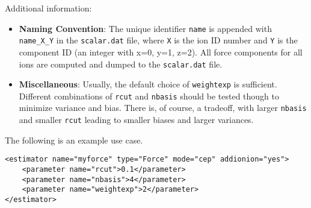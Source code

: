 Additional information:
\begin{itemize}
  \item{\textbf{Naming Convention}:  The unique identifier \texttt{name} is appended with \texttt{name\_X\_Y} in the \texttt{scalar.dat} file, where \texttt{X} is the ion ID number and \texttt{Y} is the component ID (an integer with x=0, y=1, z=2).  All force components for all ions are computed and dumped to the \texttt{scalar.dat} file.}
  \item{\textbf{Miscellaneous}: Usually, the default choice of \texttt{weightexp} is sufficient.  Different combinations of \texttt{rcut} and  \texttt{nbasis} should be tested though to minimize variance and bias.  There is, of course, a tradeoff, with larger \texttt{nbasis} and smaller \texttt{rcut} leading to smaller biases and larger variances.  }
\end{itemize}

The following is an example use case.  
\begin{lstlisting}[style=QMCPXML]
<estimator name="myforce" type="Force" mode="cep" addionion="yes">
    <parameter name="rcut">0.1</parameter>
    <parameter name="nbasis">4</parameter>
    <parameter name="weightexp">2</parameter>
</estimator>
\end{lstlisting}


